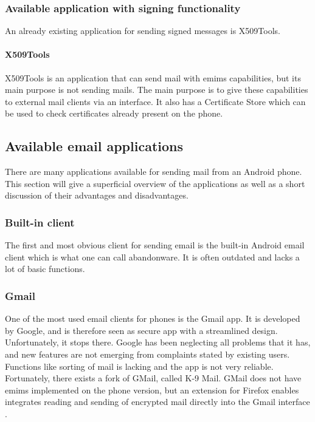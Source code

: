 \newpage

\subsubsection{Available application with signing functionality}
An already existing application for sending signed messages is X509Tools.

\paragraph{X509Tools} \hfill
\newline
X509Tools is an application that can send mail with \gls{emims} capabilities, but its main purpose is not sending mails. The main purpose is to give these capabilities to external mail clients via an interface. It also has a Certificate Store which can be used to check certificates already present on the phone. 

\subsection{Available email applications}
There are many applications available for sending mail from an Android phone. This section will give a superficial overview of the applications as well as a short discussion of their advantages and disadvantages.

\subsubsection{Built-in client}
The first and most obvious client for sending email is the built-in Android email client which is what one can call abandonware. It is often outdated and lacks a lot of basic functions.

\subsubsection{Gmail}
One of the most used email clients for phones is the Gmail app. It is developed by Google, and is therefore seen as secure app with a streamlined design. Unfortunately, it stops there. Google has been neglecting all problems that it has, and new features are not emerging from complaints stated by existing users. Functions like sorting of mail is lacking and the app is not very reliable. Fortunately, there exists a fork of GMail, called K-9 Mail. GMail does not have \gls{emims} implemented on the phone version, but an extension for Firefox enables integrates reading and sending of encrypted mail directly into the Gmail interface \cite{bib:gmail}.

